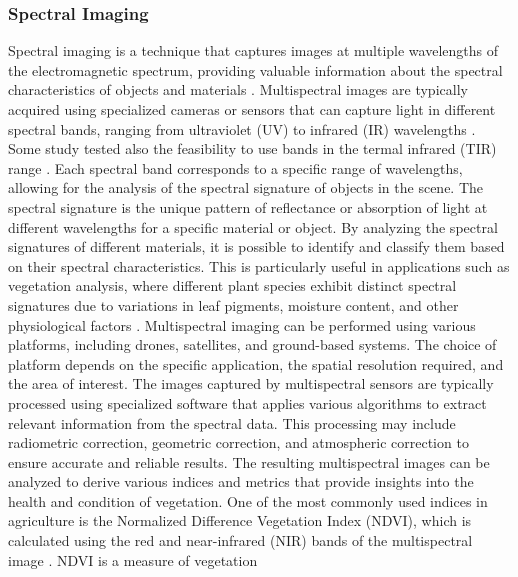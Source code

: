 \documentclass[12pt,a4paper,oneside]{report}
\begin{document}
\subsubsection{Spectral Imaging}
Spectral imaging is a technique that captures images at multiple wavelengths
of the electromagnetic spectrum, providing valuable information about the spectral
characteristics of objects and materials
\cite{meerImagingSpectrometryBasic2001,thenkabailHyperspectralRemoteSensing2016}. 
Multispectral images are typically acquired using specialized
cameras or sensors that can capture light in different spectral bands, ranging
from ultraviolet (UV) to infrared (IR) wavelengths
\cite{thenkabailHyperspectralRemoteSensing2016,mahleinHyperspectralSensorsImaging2018}. 
Some study tested also the 
feasibility to use bands in the termal infrared (TIR) range \cite{wanOptimizingUAVbasedUncooled2024}.
Each spectral band corresponds
to a specific range of wavelengths, allowing for the analysis of the spectral
signature of objects in the scene.
The spectral signature is the unique pattern of reflectance or absorption of
light at different wavelengths for a specific material or object. By analyzing
the spectral signatures of different materials, it is possible to identify and
classify them based on their spectral characteristics. This is particularly useful
in applications such as vegetation analysis, where different plant species exhibit
distinct spectral signatures due to variations in leaf pigments, moisture content,
and other physiological factors
\cite{sarviaGeometricVsSpectral2024}.
Multispectral imaging can be performed using various platforms, including
drones, satellites, and ground-based systems. The choice of platform depends on
the specific application, the spatial resolution required, and the area of interest.
The images captured by multispectral sensors are typically processed using
specialized software that applies various algorithms to extract relevant information
from the spectral data. This processing may include radiometric correction,
geometric correction, and atmospheric correction to ensure accurate and reliable
results.
The resulting multispectral images can be analyzed to derive various indices
and metrics that provide insights into the health and condition of vegetation.
One of the most commonly used indices in agriculture is the Normalized Difference
Vegetation Index (NDVI), which is calculated using the red and near-infrared
(NIR) bands of the multispectral image \cite{rouseMonitoringVegetationSystems1974,tuckerRedPhotographicInfrared1979}. 
NDVI is a measure of vegetation
\end{document}

